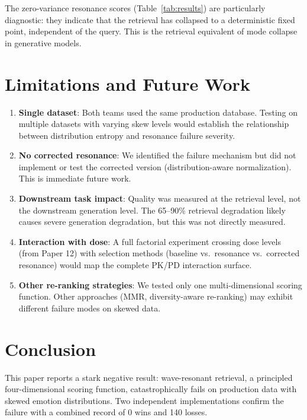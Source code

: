 \documentclass[11pt,a4paper]{article}
\begin{document}
The zero-variance resonance scores (Table~\ref{tab:results}) are particularly diagnostic: they indicate that the retrieval has collapsed to a deterministic fixed point, independent of the query. This is the retrieval equivalent of mode collapse in generative models.

\section{Limitations and Future Work}

\begin{enumerate}[leftmargin=*, itemsep=3pt]
  \item \textbf{Single dataset}: Both teams used the same production database. Testing on multiple datasets with varying skew levels would establish the relationship between distribution entropy and resonance failure severity.
  \item \textbf{No corrected resonance}: We identified the failure mechanism but did not implement or test the corrected version (distribution-aware normalization). This is immediate future work.
  \item \textbf{Downstream task impact}: Quality was measured at the retrieval level, not the downstream generation level. The 65--90\% retrieval degradation likely causes severe generation degradation, but this was not directly measured.
  \item \textbf{Interaction with dose}: A full factorial experiment crossing dose levels (from Paper 12) with selection methods (baseline vs.\ resonance vs.\ corrected resonance) would map the complete PK/PD interaction surface.
  \item \textbf{Other re-ranking strategies}: We tested only one multi-dimensional scoring function. Other approaches (MMR, diversity-aware re-ranking) may exhibit different failure modes on skewed data.
\end{enumerate}

\section{Conclusion}

This paper reports a stark negative result: wave-resonant retrieval, a principled four-dimensional scoring function, catastrophically fails on production data with skewed emotion distributions. Two independent implementations confirm the failure with a combined record of 0 wins and 140 losses.
\end{document}
